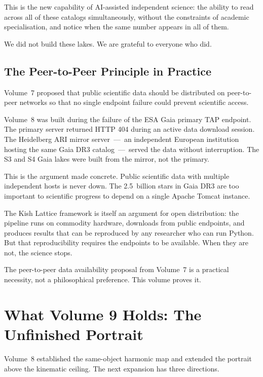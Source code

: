 \documentclass[11pt, letterpaper, openany]{book}
\begin{document}
This is the new capability of AI-assisted independent science: the ability to read
across all of these catalogs simultaneously, without the constraints of academic
specialisation, and notice when the same number appears in all of them.

We did not build these lakes. We are grateful to everyone who did.

\section{The Peer-to-Peer Principle in Practice}

Volume~7 proposed that public scientific data should be distributed on peer-to-peer
networks so that no single endpoint failure could prevent scientific access.

Volume~8 was built during the failure of the ESA Gaia primary TAP endpoint. The
primary server returned HTTP 404 during an active data download session. The
Heidelberg ARI mirror server~---~an independent European institution hosting the
same Gaia DR3 catalog~---~served the data without interruption. The S3 and S4 Gaia
lakes were built from the mirror, not the primary.

This is the argument made concrete. Public scientific data with multiple independent
hosts is never down. The 2.5~billion stars in Gaia DR3 are too important to
scientific progress to depend on a single Apache Tomcat instance.

The Kish Lattice framework is itself an argument for open distribution: the pipeline
runs on commodity hardware, downloads from public endpoints, and produces results
that can be reproduced by any researcher who can run Python. But that reproducibility
requires the endpoints to be available. When they are not, the science stops.

The peer-to-peer data availability proposal from Volume~7 is a practical necessity,
not a philosophical preference. This volume proves it.

\clearpage

\chapter{What Volume 9 Holds: The Unfinished Portrait}

Volume~8 established the same-object harmonic map and extended the portrait above
the kinematic ceiling. The next expansion has three directions.
\end{document}

